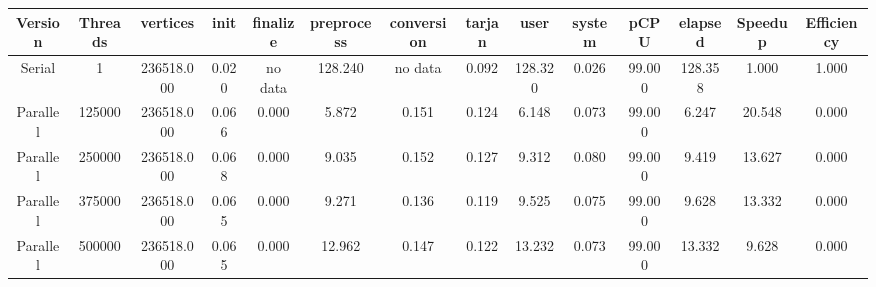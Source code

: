 \begin{tabular}{|c|c|c|c|c|c|c|c|c|c|c|c|c|c|}
\toprule
 Version &  Threads &   vertices &  init & finalize &  preprocess & conversion &  tarjan &    user &  system &   pCPU &  elapsed &  Speedup &  Efficiency \\
\midrule
  Serial &        1 & 236518.000 & 0.020 &  no data &     128.240 &    no data &   0.092 & 128.320 &   0.026 & 99.000 &  128.358 &    1.000 &       1.000 \\
Parallel &   125000 & 236518.000 & 0.066 &    0.000 &       5.872 &      0.151 &   0.124 &   6.148 &   0.073 & 99.000 &    6.247 &   20.548 &       0.000 \\
Parallel &   250000 & 236518.000 & 0.068 &    0.000 &       9.035 &      0.152 &   0.127 &   9.312 &   0.080 & 99.000 &    9.419 &   13.627 &       0.000 \\
Parallel &   375000 & 236518.000 & 0.065 &    0.000 &       9.271 &      0.136 &   0.119 &   9.525 &   0.075 & 99.000 &    9.628 &   13.332 &       0.000 \\
Parallel &   500000 & 236518.000 & 0.065 &    0.000 &      12.962 &      0.147 &   0.122 &  13.232 &   0.073 & 99.000 &   13.332 &    9.628 &       0.000 \\
\bottomrule
\end{tabular}
